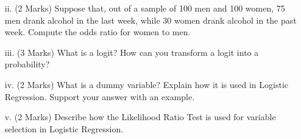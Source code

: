 \documentclass[a4paper,12pt]{article}
\begin{document}
\begin{itemize}
\item[ii.](2 Marks) Suppose that, out of a sample of 100 men and 100 women, 75 men drank alcohol in the last week, while 30 women drank alcohol in the past week. Compute the odds ratio for women to men.
\item[iii.](3 Marks)
What is a logit? How can you transform a logit into a probability?
\item[iv.](2 Marks)
What is a dummy variable? Explain how it is used in Logistic Regression. Support your answer with an example.
\item[v.](2 Marks) Describe how the Likelihood Ratio Test is used for variable selection in Logistic Regression.
\end{itemize}
\end{document}

